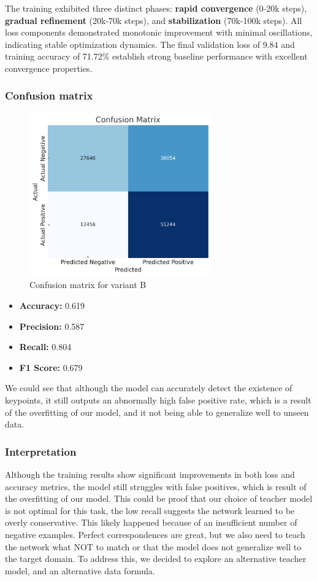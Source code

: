 The training exhibited three distinct phases: \textbf{rapid convergence} (0-20k
steps), \textbf{gradual refinement} (20k-70k steps), and \textbf{stabilization}
(70k-100k steps). All loss components demonstrated monotonic improvement with
minimal oscillations, indicating stable optimization dynamics. The final
validation loss of 9.84 and training accuracy of 71.72\% establish strong
baseline performance with excellent convergence properties.
\subsubsection{Confusion matrix}
\begin{figure}[H]
    \centering
    \includegraphics[width=0.7\textwidth]{ressources/confusion_matrix_3.png}
    \caption{Confusion matrix for variant B}
    \label{fig:confusion_matrix_3}
\end{figure}
\begin{itemize}
    \item \textbf{Accuracy: }0.619
    \item \textbf{Precision: }0.587
    \item \textbf{Recall: }0.804
    \item \textbf{F1 Score: }0.679
\end{itemize}
We could see that although the model can accurately detect the existence of keypoints, it still outputs an abnormally high false positive rate, which is a result of the overfitting of our model, and it not being able to generalize well to unseen data.
\subsubsection{Interpretation}
Although the training results show significant improvements in both loss and
accuracy metrics, the model still struggles with false positives, which is
result of the overfitting of our model. This could be proof that our choice of
teacher model is not optimal for this task, the low recall suggests the network learned to be overly conservative. This likely happened because of an insufficient number of negative examples. Perfect correspondences are great, but we also need to teach the network what NOT to match or that the model does not
generalize well to the target domain. To address this, we decided to explore an
alternative teacher model, and an alternative data formula.
